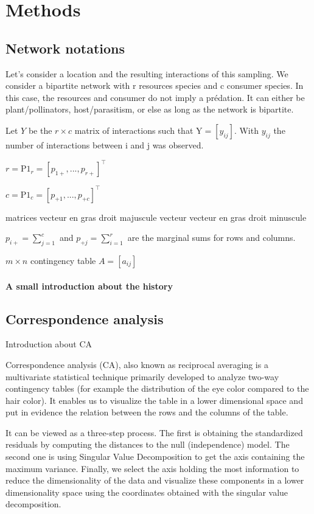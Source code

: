 \section{Methods}

\subsection{Network notations}
Let's consider a location and the resulting interactions of this sampling. We consider a bipartite network with r resources species and c consumer species. In this case, the resources and consumer do not imply a prédation. It can either be plant/pollinators, host/parasitism, or else as long as the network is bipartite. 

Let $Y$ be the $r\times c$ matrix of interactions such that $\textrm{Y} = [y_{ij}]$. With $y_{ij}$ the number of interactions between i and j was observed.

$r=\textrm{P1}_r =[p_{1+}, ..., p_{r+}]^\intercal$

$c=\textrm{P1}_c=[p_{+1}, ..., p_{+c}]^\intercal$

matrices vecteur en gras droit majuscule
vecteur vecteur en gras droit minuscule

$p_{i+}=\sum_{j=1}^{c}$ and $p_{+j}=\sum_{i=1}^{r}$ are the marginal sums for rows and columns.




$m\times n$ contingency table $A = [a_{ij}]$ 

\paragraph{A small introduction about the history}




\subsection{Correspondence analysis}

Introduction about CA

Correspondence analysis (CA), also known as reciprocal averaging is a multivariate statistical technique  primarily developed to analyze two-way contingency tables (for example the distribution of the eye color compared to the hair color). It enables us to visualize the table in a lower dimensional space and put in evidence the relation between the rows and the columns of the table.

It can be viewed as a three-step process. The first is obtaining the standardized residuals by computing the distances to the null (independence) model. The second one is using Singular Value Decomposition to get the axis containing the maximum variance. Finally, we select the axis holding the most information to reduce the dimensionality of the data and visualize these components in a lower dimensionality space using the coordinates obtained with the singular value decomposition.


